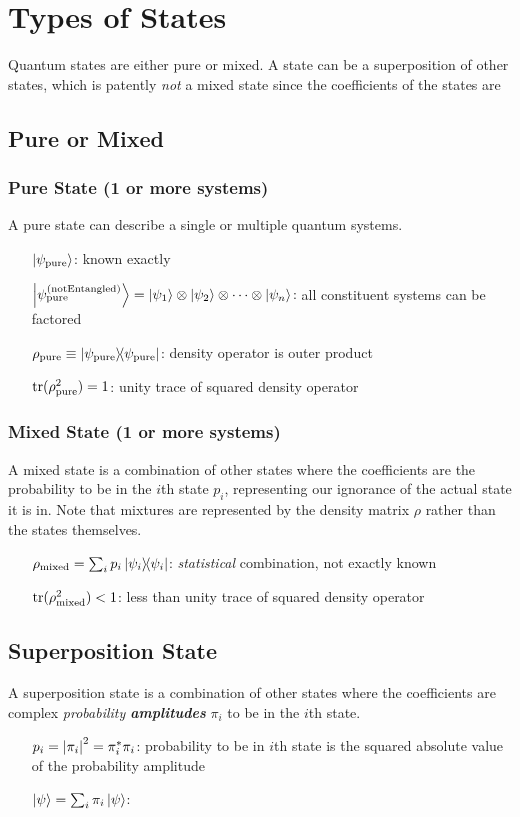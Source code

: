 \section*{Types of States}
Quantum states are either pure or mixed. A state can be a superposition of
other states, which is patently \emph{not} a mixed state since the
coefficients of the states are 
\subsection*{Pure or Mixed}
\subsubsection*{Pure State (1 or more systems)}
A pure state can describe a single or multiple quantum systems.
\begin{itemize}
\item [$\ket{\psi_{\text{pure}}}$:] known exactly
\item [$\ket{\psi_{\text{pure}}^{(\text{notEntangled})}} =
  \ket{\psi_1}\otimes\ket{\psi_2}\otimes 
  \dotsm \otimes \ket{\psi_n}$:] all constituent systems can be factored 
\item [$\rho_{\text{pure}} \equiv \outerproduct{\psi_{\text{pure}}}$:] density operator is outer product
\item [$\trace(\rho_{\text{pure}}^2) = 1$:] unity trace of squared density operator
\end{itemize}


\subsubsection*{Mixed State (1 or more systems)}
A mixed state is a combination of other states where the coefficients are
the probability to be in the $i$th state $p_i$, representing our ignorance
of the actual state it is in. Note that mixtures are represented by the
density matrix $\rho$ rather than the states themselves.
\begin{itemize}
\item [$\rho_{\text{mixed}} = \sum_i p_i\outerproduct{\psi_i}$:]
  \emph{statistical} combination, not exactly known
\item [$\trace(\rho_{\text{mixed}}^2) < 1$:] less than unity trace of squared density operator
\end{itemize}

\subsection*{Superposition State}
A superposition state is a combination of other states where the
coefficients are complex \emph{probability \textbf{amplitudes}} $\pi_i$ to be in
the $i$th state. 
\begin{itemize}
\item [$p_i = \absolutevalue{\pi_i}^2 = \pi_i^* \pi_i$:] probability to be
  in $i$th state is the squared absolute value of the probability amplitude
\item [$\ket{\psi} = \sum_i \pi_i\ket{\psi}$:] 
\end{itemize}

